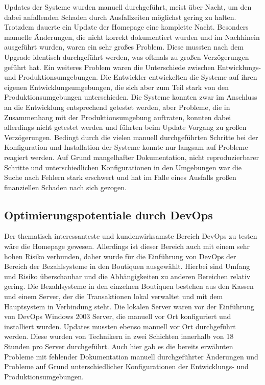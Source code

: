 Updates der Systeme wurden manuell durchgeführt, meist über Nacht, um den dabei anfallenden Schaden durch Ausfallzeiten möglichst gering zu halten. 
Trotzdem dauerte ein Update der Homepage eine komplette Nacht. 
Besonders manuelle Änderungen, die nicht korrekt dokumentiert wurden und im Nachhinein ausgeführt wurden, waren ein sehr großes Problem. 
Diese mussten nach dem Upgrade identisch durchgeführt werden, was oftmals zu großen Verzögerungen geführt hat. 
Ein weiteres Problem waren die Unterschiede zwischen Entwicklungs- und Produktionsumgebungen. 
Die Entwickler entwickelten die Systeme auf ihren eigenen Entwicklungsumgebungen, die sich aber zum Teil stark von den Produktionsumgebungen unterschieden. 
Die Systeme konnten zwar im Anschluss an die Entwicklung entsprechend getestet werden, aber Probleme, die in Zusammenhang mit der Produktionsumgebung auftraten, konnten dabei allerdings nicht getestet werden und führten beim Update Vorgang zu großen Verzögerungen.
Bedingt durch die vielen manuell durchgeführten Schritte bei der Konfiguration und Installation der Systeme konnte nur langsam auf Probleme reagiert werden. 
Auf Grund mangelhafter Dokumentation, nicht reproduzierbarer Schritte und unterschiedlichen Konfigurationen in den Umgebungen war die Suche nach Fehlern stark erschwert und hat im Falle eines Ausfalls großen finanziellen Schaden nach sich gezogen. 
\parencite[Vgl.][S. 2 - 4]{Reed:2014}

\subsection{Optimierungspotentiale durch DevOps}
Der thematisch interessanteste und kundenwirksamste Bereich DevOps zu testen wäre die Homepage gewesen. 
Allerdings ist dieser Bereich auch mit einem sehr hohen Risiko verbunden, daher wurde für die Einführung von DevOps der Bereich der Bezahlsysteme in den Boutiquen ausgewählt. 
Hierbei sind Umfang und Risiko überschaubar und die Abhängigkeiten zu anderen Bereichen relativ gering.
Die Bezahlsysteme in den einzelnen Boutiquen bestehen aus den Kassen und einem Server, der die Transaktionen lokal verwaltet und mit dem Hauptsystem in Verbindung steht. 
Die lokalen Server waren vor der Einführung von DevOps Windows 2003 Server, die manuell vor Ort konfiguriert und installiert wurden. 
Updates mussten ebenso manuell vor Ort durchgeführt werden. Diese wurden von Technikern in zwei Schichten innerhalb von 18 Stunden pro Server durchgeführt. 
Auch hier gab es die bereits erwähnten Probleme mit fehlender Dokumentation manuell durchgeführter Änderungen und Probleme auf Grund unterschiedlicher Konfigurationen der Entwicklungs- und Produktionsumgebungen. 
\parencite[Vgl.][S. 5]{Reed:2014}

